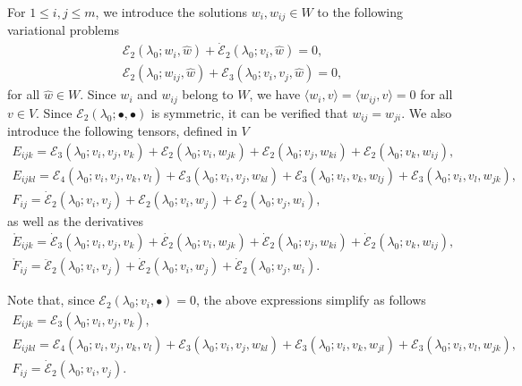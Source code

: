 \documentclass[12pt, final]{scrartcl}
\theoremstyle{definition}
\newcommand{\E}{\mathcal E}
\begin{document}
For $1 ≤ i, j ≤ m$, we introduce the solutions $w_i, w_{ij} \in W$ to the
following variational problems
\begin{gather}
  \label{eq:20220524134525}
  \E_2(\lambda_0; w_i, \hat{w}) + \dot{\E}_2(\lambda_0; v_i, \hat{w}) = 0,\\
  \label{eq:20220519164523}
  \E_2(\lambda_0; w_{i j}, \hat{w})+\E_3(\lambda_0; v_i, v_j, \hat{w}) = 0,
\end{gather}
for all $\hat{w} \in W$. Since $w_{i}$ and $w_{ij}$ belong to $W$, we have
$〈 w_{i}, v 〉 = 〈 w_{ij}, v 〉 = 0$ for all $v \in V$. Since $\E_2(\lambda_0; •,
•)$ is symmetric, it can be verified that $w_{ij}=w_{ji}$. We also introduce
the following tensors, defined in $V$
\begin{gather}
  E_{ijk} = \E_3(\lambda_0; v_i, v_j, v_k) + \E_2(\lambda_0; v_i, w_{jk}) + \E_2(\lambda_0; v_j, w_{ki}) + \E_2(\lambda_0; v_k, w_{ij}),\\
  E_{ijkl} = \E_4(\lambda_0 ; v_i, v_j, v_k, v_l) + \E_3(\lambda_0 ; v_i, v_j, w_{kl}) + \E_3(\lambda_0 ; v_i, v_k, w_{lj}) + \E_3(\lambda_0 ; v_i, v_l, w_{jk}),\\
  F_{ij} = \dot{\E}_2(\lambda_0; v_i, v_j) + \E_2(\lambda_0; v_i, w_j) + \E_2(\lambda_0; v_j, w_i),
\end{gather}
as well as the derivatives
\begin{gather}
  \label{eq:20220615063626}
  \mathring{E}_{ijk} = \dot{\E}_3(\lambda_0; v_i, v_j, v_k) + \dot{\E_2}(\lambda_0; v_i, w_{jk}) + \dot{\E}_2(\lambda_0; v_j, w_{ki}) + \dot{\E}_2(\lambda_0; v_k, w_{ij}),\\
  \label{eq:20220615063633}
  \mathring{F}_{ij} = \ddot{\E}_2(\lambda_0; v_i, v_j) + \dot{\E}_2(\lambda_0; v_i, w_j) + \dot{\E}_2(\lambda_0; v_j, w_i).
\end{gather}

Note that, since $\E_2(\lambda_0; v_i, •) = 0$, the above expressions simplify as follows
\begin{gather}
  \label{eq:20220524135619}
  E_{ijk} = \E_3(\lambda_0; v_i, v_j, v_k),\\
  \label{eq:20220524135553}
  E_{ijkl} = \E_4(\lambda_0 ; v_i, v_j, v_k, v_l) + \E_3(\lambda_0 ; v_i, v_j, w_{kl}) + \E_3(\lambda_0 ; v_i, v_k, w_{jl}) + \E_3(\lambda_0 ; v_i, v_l, w_{jk}),\\
  \label{eq:20220524135643}
  F_{ij} = \dot{\E}_2(\lambda_0; v_i, v_j).
\end{gather}
\end{document}
